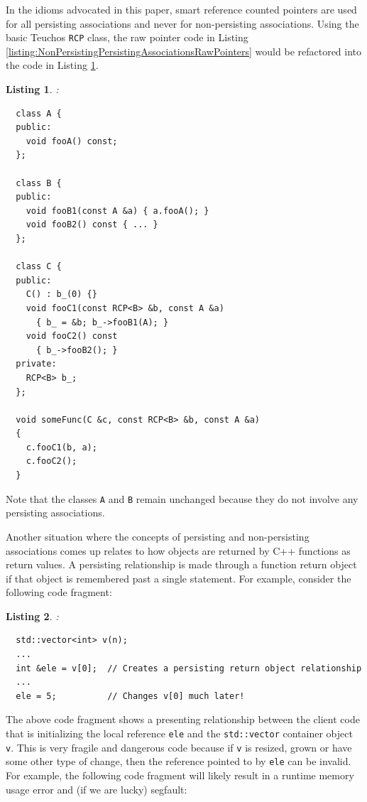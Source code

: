 \documentclass[pdf,ps2pdf,11pt]{SANDreport}
\newtheorem{listing}{Listing}
\begin{document}
In the idioms advocated in this paper, smart reference counted
pointers are used for all persisting associations and never for
non-persisting associations.  Using the basic Teuchos {}\texttt{RCP}
class, the raw pointer code in Listing
{}\ref{listing:NonPersistingPersistingAssociationsRawPointers} would
be refactored into the code in Listing
{}\ref{listing:NonPersistingPersistingAssociationsRCP}.

\begin{listing}:\\
\label{listing:NonPersistingPersistingAssociationsRCP}
{\small\begin{verbatim}
  class A {
  public:
    void fooA() const;
  };

  class B {
  public:
    void fooB1(const A &a) { a.fooA(); }
    void fooB2() const { ... }
  };

  class C {
  public:
    C() : b_(0) {}
    void fooC1(const RCP<B> &b, const A &a)
      { b_ = &b; b_->fooB1(A); }
    void fooC2() const
      { b_->fooB2(); }
  private:
    RCP<B> b_;
  };

  void someFunc(C &c, const RCP<B> &b, const A &a)
  {
    c.fooC1(b, a);
    c.fooC2();
  }
\end{verbatim}}
\end{listing}

Note that the classes {}\texttt{A} and {}\texttt{B} remain unchanged
because they do not involve any persisting associations.

Another situation where the concepts of persisting and non-persisting
associations comes up relates to how objects are returned by C++
functions as return values.  A persisting relationship is made through
a function return object if that object is remembered past a single
statement.  For example, consider the following code fragment:

\begin{listing}:\\
{\small\begin{verbatim}
  std::vector<int> v(n);
  ...
  int &ele = v[0];  // Creates a persisting return object relationship
  ...
  ele = 5;          // Changes v[0] much later!
\end{verbatim}}
\end{listing}

The above code fragment shows a presenting relationship between the
client code that is initializing the local reference {}\texttt{ele}
and the {}\texttt{std::vector} container object {}\texttt{v}.  This is
very fragile and dangerous code because if {}\texttt{v} is resized,
grown or have some other type of change, then the reference pointed to
by {}\texttt{ele} can be invalid.  For example, the following code
fragment will likely result in a runtime memory usage error and (if
we are lucky) segfault:
\end{document}
